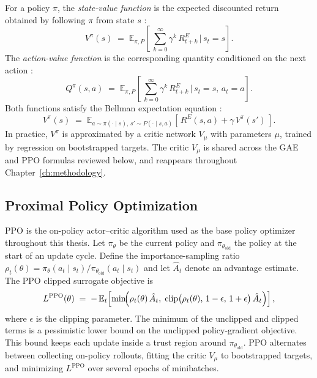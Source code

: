 For a policy $\pi$, the \emph{state-value function} is the expected discounted return obtained by following $\pi$ from state $s$ \cite{sutton2018rl}:
\begin{equation}
V^\pi(s) \;=\; \mathbb{E}_{\pi, P}\!\left[\, \sum_{k=0}^{\infty} \gamma^k\, R_{t+k}^E \,\Big|\, s_t = s \right].
\label{eq:value_function}
\end{equation}
The \emph{action-value function} is the corresponding quantity conditioned on the next action \cite{sutton2018rl}:
\begin{equation}
Q^\pi(s, a) \;=\; \mathbb{E}_{\pi, P}\!\left[\, \sum_{k=0}^{\infty} \gamma^k\, R_{t+k}^E \,\Big|\, s_t = s,\, a_t = a \right].
\label{eq:action_value}
\end{equation}
Both functions satisfy the Bellman expectation equation \cite{sutton2018rl}:
\begin{equation}
V^\pi(s) \;=\; \mathbb{E}_{a \sim \pi(\cdot \mid s),\, s' \sim P(\cdot \mid s, a)}\!\left[\, R^E(s, a) + \gamma\, V^\pi(s') \,\right].
\label{eq:bellman}
\end{equation}
In practice, $V^\pi$ is approximated by a critic network $V_\mu$ with parameters $\mu$, trained by regression on bootstrapped targets. The critic $V_\mu$ is shared across the GAE and PPO formulas reviewed below, and reappears throughout Chapter~\ref{ch:methodology}.

\subsection{Proximal Policy Optimization}
\label{sec:ppo_background}

PPO \cite{schulman2017ppo} is the on-policy actor--critic algorithm used as the base policy optimizer throughout this thesis. Let $\pi_\theta$ be the current policy and $\pi_{\theta_\text{old}}$ the policy at the start of an update cycle. Define the importance-sampling ratio $\rho_t(\theta) = \pi_\theta(a_t \mid s_t) / \pi_{\theta_\text{old}}(a_t \mid s_t)$ and let $\hat A_t$ denote an advantage estimate. The PPO clipped surrogate objective is
\begin{equation}
L^\text{PPO}(\theta) \;=\; -\,\mathbb{E}_t\!\left[
\min\!\Bigl(
\rho_t(\theta)\, \hat A_t,\;
\text{clip}\bigl(\rho_t(\theta),\, 1 - \epsilon,\, 1 + \epsilon\bigr)\, \hat A_t
\Bigr) \right],
\label{eq:ppo_clip}
\end{equation}
where $\epsilon$ is the clipping parameter. The minimum of the unclipped and clipped terms is a pessimistic lower bound on the unclipped policy-gradient objective. This bound keeps each update inside a trust region around $\pi_{\theta_\text{old}}$. PPO alternates between collecting on-policy rollouts, fitting the critic $V_\mu$ to bootstrapped targets, and minimizing $L^\text{PPO}$ over several epochs of minibatches.

